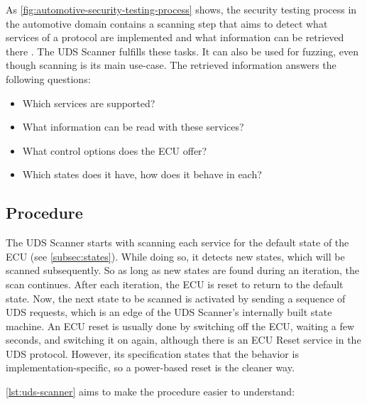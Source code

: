As \autoref{fig:automotive-security-testing-process} shows, the security testing process in the automotive domain contains a scanning step that aims to detect what services of a protocol are implemented and what information can be retrieved there \cite{Bayer2015}. The UDS Scanner fulfills these tasks. It can also be used for fuzzing, even though scanning is its main use-case. The retrieved information answers the following questions:

\begin{itemize}
\item Which services are supported?
\item What information can be read with these services?
\item What control options does the ECU offer?
\item Which states does it have, how does it behave in each?
\end{itemize}


\subsection{Procedure}

The UDS Scanner starts with scanning each service for the default state of the ECU (see \autoref{subsec:states}). While doing so, it detects new states, which will be scanned subsequently. So as long as new states are found during an iteration, the scan continues. After each iteration, the ECU is reset to return to the default state. Now, the next state to be scanned is activated by sending a sequence of UDS requests, which is an edge of the UDS Scanner's internally built state machine. An ECU reset is usually done by switching off the ECU, waiting a few seconds, and switching it on again, although there is an ECU Reset service in the UDS protocol. However, its specification states that the behavior is implementation-specific, so a power-based reset is the cleaner way.

\autoref{lst:uds-scanner} aims to make the procedure easier to understand:

